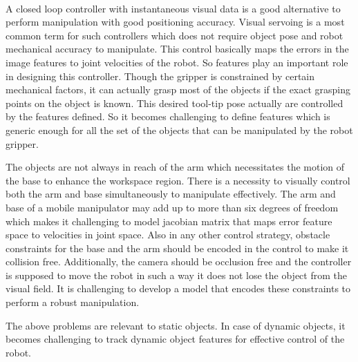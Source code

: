  \paragraph{}
 A closed loop controller with instantaneous visual data is a good alternative to perform manipulation with good positioning accuracy. Visual servoing is a most common term for such controllers which does not require object pose and robot mechanical accuracy to manipulate. This control basically maps the errors in the image features to joint velocities of the robot. So features play an important role in designing this controller. Though the gripper is constrained by certain mechanical factors, it can actually grasp most of the objects if the exact grasping points on the object is known. This desired tool-tip pose actually are controlled by the features defined. So it becomes challenging to define features which is generic enough for all the set of the objects that can be manipulated by the robot gripper. 
 
 The objects are not always in reach of the arm which necessitates the motion of the base to enhance the workspace region. There is a necessity to visually control both the arm and base simultaneously to manipulate effectively. The arm and base of a mobile manipulator may add up to more than six degrees of freedom which makes it challenging to model jacobian matrix that maps error feature space to velocities in joint space. Also in any other control strategy, obstacle constraints for the base and the arm should be encoded in the control to make it collision free. Additionally, the camera should be occlusion free and the controller is supposed to move the robot in such a way it does not lose the object from the visual field. It is challenging to develop a model that encodes these constraints to perform a robust manipulation. 
 
 The above problems are relevant to static objects. In case of dynamic objects, it becomes challenging to track dynamic object features for effective control of the robot. 

